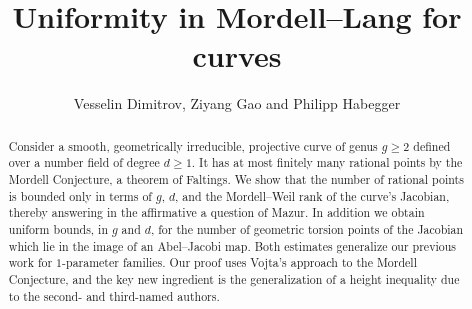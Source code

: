 \documentclass[12pt,oneside]{amsart}
\begin{document}
\title{Uniformity in Mordell--Lang for curves}

\author{Vesselin Dimitrov, Ziyang Gao and Philipp Habegger}

\address{Department of Mathematics, University of Toronto, 40 St. George Street, Toronto, Ontario, Canada M5S 2E4}
\address{CNRS, IMJ-PRG, 4 place Jussieu, 75005 Paris, France}
\address{Department of Mathematics and Computer Science, University of Basel, Spiegelgasse 1, 4051 Basel, Switzerland}






\maketitle

\begin{abstract}
  Consider a smooth, geometrically irreducible, projective curve of genus
$g\ge 2$ defined over a number field of degree $d \ge 1$.
It has at most finitely many rational points by
the Mordell Conjecture, a theorem of 
Faltings. 
We show that the number of rational points is bounded only
in terms of $g$, $d$, and the Mordell--Weil rank of the curve's
Jacobian, thereby answering in the affirmative a question of Mazur. 
In
addition we obtain uniform bounds, in $g$ and $d$, for the number of
geometric torsion points of the Jacobian which lie in the image of an
Abel--Jacobi map. Both estimates generalize our previous work for $1$-parameter families. Our proof uses Vojta's approach to the Mordell Conjecture, and the key new ingredient is the generalization of a height inequality due to the second- and third-named
authors.%
\end{abstract}
\end{document}
